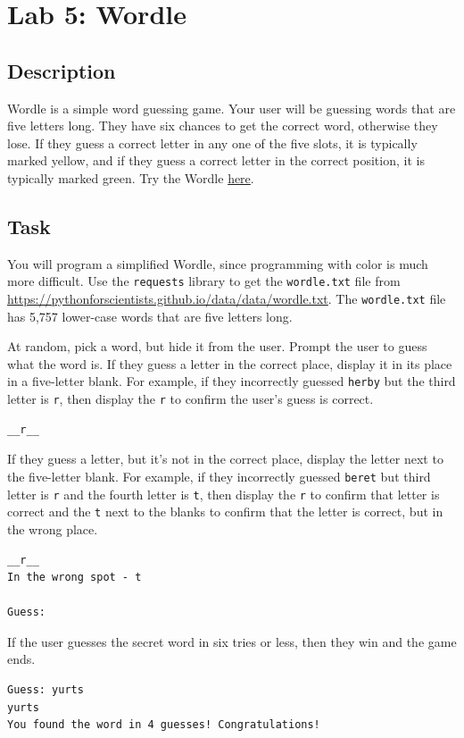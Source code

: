 \section*{Lab 5: Wordle}
\subsection*{Description}
Wordle is a simple word guessing game. Your user will be guessing words that are five letters long. They have six chances to get the correct word, otherwise they lose. If they guess a correct letter in any one of the five slots, it is typically marked yellow, and if they guess a correct letter in the correct position, it is typically marked green. Try the Wordle \href{https://www.nytimes.com/games/wordle/index.html}{here}.
\subsection*{Task}
You will program a simplified Wordle, since programming with color is much more difficult. Use the \verb|requests| library to get the \verb|wordle.txt| file from \\\href{https://pythonforscientists.github.io/data/data/wordle.txt}{https://pythonforscientists.github.io/data/data/wordle.txt}. The \verb|wordle.txt| file has 5,757 lower-case words that are five letters long.\par
At random, pick a word, but hide it from the user. Prompt the user to guess what the word is. If they guess a letter in the correct place, display it in its place in a five-letter blank. For example, if they incorrectly guessed \verb|herby| but the third letter is \verb|r|, then display the \verb|r| to confirm the user's guess is correct.
\begin{lstlisting}[style=none]
__r__
\end{lstlisting}
If they guess a letter, but it's not in the correct place, display the letter next to the five-letter blank. For example, if they incorrectly guessed \verb|beret| but third letter is \verb|r| and the fourth letter is \verb|t|, then display the \verb|r| to confirm that letter is correct and the \verb|t| next to the blanks to confirm that the letter is correct, but in the wrong place.
\begin{lstlisting}[style=none]
__r__
In the wrong spot - t

Guess: 
\end{lstlisting}
If the user guesses the secret word in six tries or less, then they win and the game ends.
\begin{lstlisting}[style=none]
Guess: yurts
yurts
You found the word in 4 guesses! Congratulations!
\end{lstlisting}
